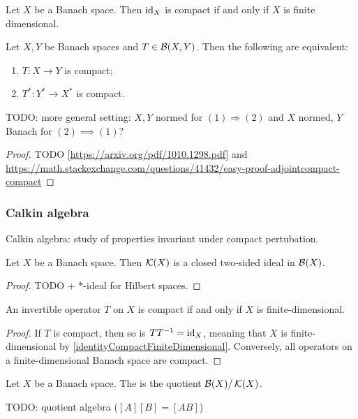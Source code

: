 \begin{lemma} \label{identityCompactFiniteDimensional}
Let $X$ be a Banach space. Then $\operatorname{id}_X$ is compact \textup{if and only if} $X$ is finite dimensional.
\end{lemma}

\begin{theorem} \label{SchaudersTheorem}
Let $X,Y$ be Banach spaces and $T\in\operatorname{\mathcal{B}}(X,Y)$. Then the following are equivalent:
\begin{enumerate}
\item $T: X\to Y$ is compact;
\item $T^*: Y^* \to X^*$ is compact.
\end{enumerate}
\end{theorem}
TODO: more general setting: $X,Y$ normed for $(1) \Rightarrow (2)$ and $X$ normed, $Y$ Banach for $(2)\implies (1)$?
\begin{proof}
TODO \ref{https://arxiv.org/pdf/1010.1298.pdf} and \url{https://math.stackexchange.com/questions/41432/easy-proof-adjointcompact-compact}
\end{proof}

\subsubsection{Calkin algebra}
Calkin algebra: study of properties invariant under compact pertubation.

\begin{proposition}
Let $X$ be a Banach space. Then $\operatorname{\mathcal{K}}(X)$ is a closed two-sided ideal in $\operatorname{\mathcal{B}}(X)$.
\end{proposition}
\begin{proof}
TODO + $*$-ideal for Hilbert spaces.
\end{proof}
\begin{corollary}
An invertible operator $T$ on $X$ is compact \textup{if and only if} $X$ is finite-dimensional.
\end{corollary}
\begin{proof}
If $T$ is compact, then so is $TT^{-1} = \operatorname{id}_X$, meaning that $X$ is finite-dimensional by \ref{identityCompactFiniteDimensional}. Conversely, all operators on a finite-dimensional Banach space are compact.
\end{proof}

\begin{definition}
Let $X$ be a Banach space. The  is the quotient $\operatorname{\mathcal{B}}(X)/\operatorname{\mathcal{K}}(X)$.
\end{definition}
TODO: quotient algebra ($[A][B] = [AB]$)

